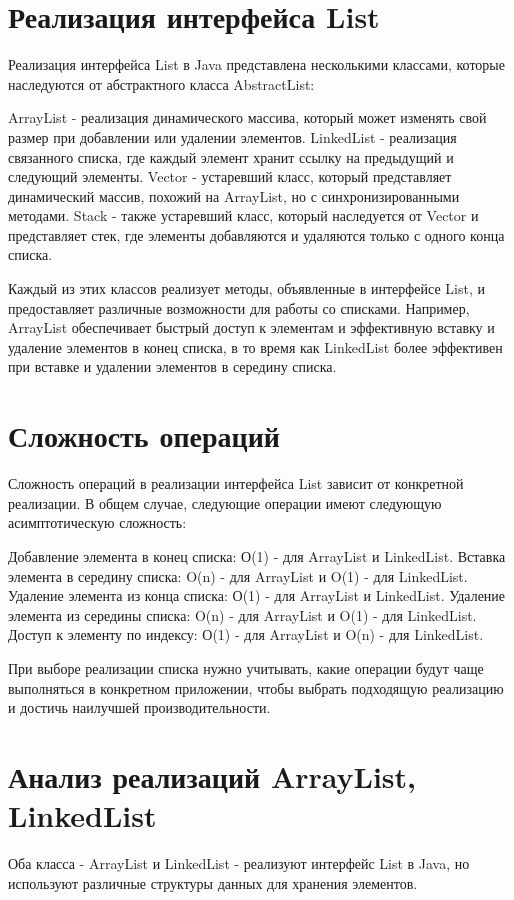 \section{Реализация интерфейса List}
Реализация интерфейса List в Java представлена несколькими классами, которые наследуются от абстрактного класса AbstractList:

    ArrayList - реализация динамического массива, который может изменять свой размер при добавлении или удалении элементов.
    LinkedList - реализация связанного списка, где каждый элемент хранит ссылку на предыдущий и следующий элементы.
    Vector - устаревший класс, который представляет динамический массив, похожий на ArrayList, но с синхронизированными методами.
    Stack - также устаревший класс, который наследуется от Vector и представляет стек, где элементы добавляются и удаляются только с одного конца списка.

Каждый из этих классов реализует методы, объявленные в интерфейсе List, и предоставляет различные возможности для работы со списками. Например, ArrayList обеспечивает быстрый доступ к элементам и эффективную вставку и удаление элементов в конец списка, в то время как LinkedList более эффективен при вставке и удалении элементов в середину списка.
\section{Сложность операций}
Сложность операций в реализации интерфейса List зависит от конкретной реализации. В общем случае, следующие операции имеют следующую асимптотическую сложность:

    Добавление элемента в конец списка: О(1) - для ArrayList и LinkedList.
    Вставка элемента в середину списка: O(n) - для ArrayList и O(1) - для LinkedList.
    Удаление элемента из конца списка: О(1) - для ArrayList и LinkedList.
    Удаление элемента из середины списка: O(n) - для ArrayList и O(1) - для LinkedList.
    Доступ к элементу по индексу: О(1) - для ArrayList и O(n) - для LinkedList.

При выборе реализации списка нужно учитывать, какие операции будут чаще выполняться в конкретном приложении, чтобы выбрать подходящую реализацию и достичь наилучшей производительности.

\section{Анализ реализаций ArrayList, LinkedList}
Оба класса - ArrayList и LinkedList - реализуют интерфейс List в Java, но используют различные структуры данных для хранения элементов.

